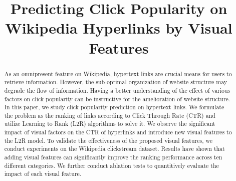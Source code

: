 \documentclass[runningheads]{llncs}
\begin{document}
%
\title{Predicting Click Popularity on Wikipedia Hyperlinks by Visual Features}
%
%
%
\maketitle              %
%
\begin{abstract}
As an omnipresent feature on Wikipedia, hypertext links are crucial means for users to retrieve information. However, the sub-optimal organization of website structure may degrade the flow of information. Having a better understanding of the effect of various factors on click popularity can be instructive for the amelioration of website structure. In this paper, we study click popularity prediction on hypertext links. We formulate the problem as the ranking of links according to Click Through Rate (CTR) and utilize Learning to Rank (L2R) algorithms to solve it. We observe the significant impact of visual factors on the CTR of hyperlinks and introduce new visual features to the L2R model. To validate the effectiveness of the proposed visual features, we conduct experiments on the Wikipedia clickstream dataset. Results have shown that adding visual features can significantly improve the ranking performance across ten different categories. We further conduct ablation tests to quantitively evaluate the impact of each visual feature.
\end{abstract}








%
%
%


\end{document}
